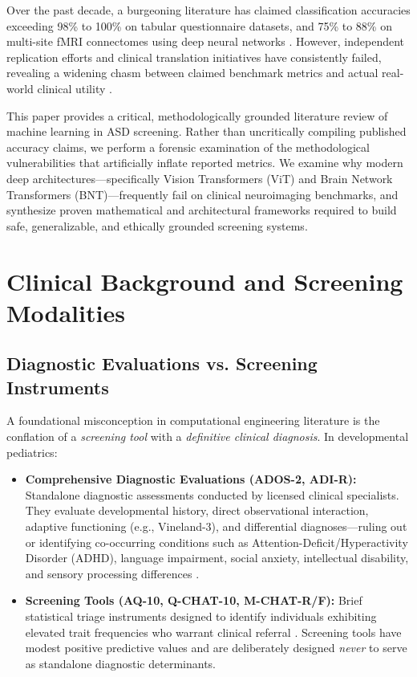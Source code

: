 \documentclass[journal]{IEEEtran}
\begin{document}
Over the past decade, a burgeoning literature has claimed classification accuracies exceeding 98\% to 100\% on tabular questionnaire datasets, and 75\% to 88\% on multi-site fMRI connectomes using deep neural networks \cite{thabtah2019machine, heinsfeld2018identification, li2018brain}. However, independent replication efforts and clinical translation initiatives have consistently failed, revealing a widening chasm between claimed benchmark metrics and actual real-world clinical utility \cite{varoquaux2018cross, he2020deep}.

This paper provides a critical, methodologically grounded literature review of machine learning in ASD screening. Rather than uncritically compiling published accuracy claims, we perform a forensic examination of the methodological vulnerabilities that artificially inflate reported metrics. We examine why modern deep architectures—specifically Vision Transformers (ViT) and Brain Network Transformers (BNT)—frequently fail on clinical neuroimaging benchmarks, and synthesize proven mathematical and architectural frameworks required to build safe, generalizable, and ethically grounded screening systems.

\section{Clinical Background and Screening Modalities}

\subsection{Diagnostic Evaluations vs. Screening Instruments}
A foundational misconception in computational engineering literature is the conflation of a \textit{screening tool} with a \textit{definitive clinical diagnosis}. In developmental pediatrics:
\begin{itemize}
    \item \textbf{Comprehensive Diagnostic Evaluations (ADOS-2, ADI-R):} Standalone diagnostic assessments conducted by licensed clinical specialists. They evaluate developmental history, direct observational interaction, adaptive functioning (e.g., Vineland-3), and differential diagnoses—ruling out or identifying co-occurring conditions such as Attention-Deficit/Hyperactivity Disorder (ADHD), language impairment, social anxiety, intellectual disability, and sensory processing differences \cite{lord2012ados, rutter2003adi}.
    \item \textbf{Screening Tools (AQ-10, Q-CHAT-10, M-CHAT-R/F):} Brief statistical triage instruments designed to identify individuals exhibiting elevated trait frequencies who warrant clinical referral \cite{allison2012toward, auyeung2008quantitative}. Screening tools have modest positive predictive values and are deliberately designed \textit{never} to serve as standalone diagnostic determinants.
\end{itemize}
\end{document}

